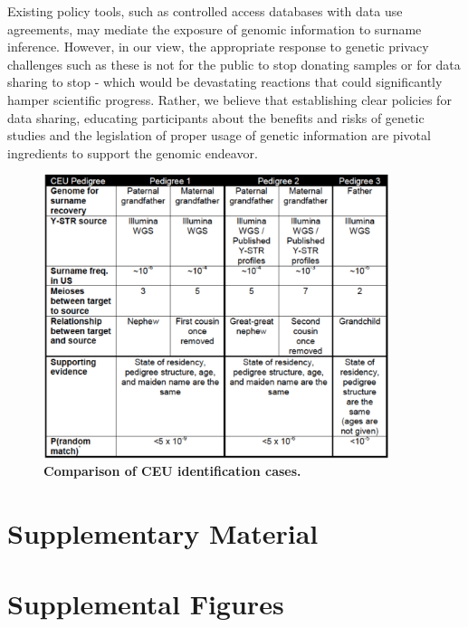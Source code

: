 Existing policy tools, such as controlled access databases with data use agreements, may mediate the exposure of genomic information to surname inference. However, in our view, the appropriate response to genetic privacy challenges such as these is not for the public to stop donating samples or for data sharing to stop - which would be devastating reactions that could significantly hamper scientific progress. Rather, we believe that establishing clear policies for data sharing, educating participants about the benefits and risks of genetic studies \cite{McGuireGibbs2006} and the legislation of proper usage of genetic information are pivotal ingredients to support the genomic endeavor.

\begin{figure}[h!]
\centering
\label{tab:surtab1}
\includegraphics[width=0.9\textwidth]{Figures/App1/Table1.pdf}
\caption{\textbf{Comparison of CEU identification cases.}}
\end{figure}

\section{Supplementary Material}
\label{sec:sursm}

\pagebreak
\section{Supplemental Figures}

